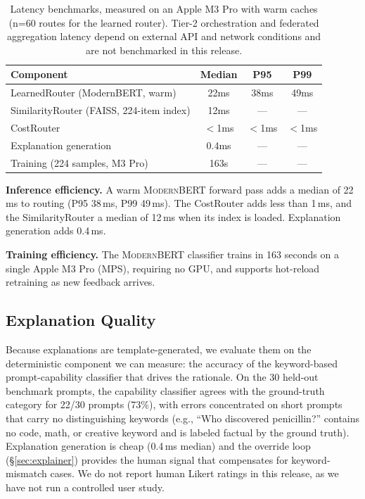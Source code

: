 \documentclass[11pt,a4paper]{article}
\newcommand{\modernbert}{\textsc{ModernBERT}}
\begin{document}
\begin{table}[t]
\centering
\small
\begin{tabular}{lccc}
\toprule
\textbf{Component} & \textbf{Median} & \textbf{P95} & \textbf{P99} \\
\midrule
LearnedRouter (ModernBERT, warm) & 22ms & 38ms & 49ms \\
SimilarityRouter (FAISS, 224-item index) & 12ms & --- & --- \\
CostRouter & $<$1ms & $<$1ms & $<$1ms \\
Explanation generation & 0.4ms & --- & --- \\
Training (224 samples, M3 Pro) & 163s & --- & --- \\
\bottomrule
\end{tabular}
\caption{Latency benchmarks, measured on an Apple M3 Pro with warm caches (n=60 routes for the learned router). Tier-2 orchestration and federated aggregation latency depend on external API and network conditions and are not benchmarked in this release.}
\label{tab:latency}
\end{table}

\textbf{Inference efficiency.}
A warm \modernbert{} forward pass adds a median of 22\,ms to routing (P95 38\,ms, P99 49\,ms).
The CostRouter adds less than 1\,ms, and the SimilarityRouter a median of 12\,ms when its index is loaded.
Explanation generation adds 0.4\,ms.

\textbf{Training efficiency.}
The \modernbert{} classifier trains in 163 seconds on a single Apple M3 Pro (MPS), requiring no GPU, and supports hot-reload retraining as new feedback arrives.

\subsection{Explanation Quality}

Because explanations are template-generated, we evaluate them on the deterministic component we can measure: the accuracy of the keyword-based prompt-capability classifier that drives the rationale.
On the 30 held-out benchmark prompts, the capability classifier agrees with the ground-truth category for 22/30 prompts (73\%), with errors concentrated on short prompts that carry no distinguishing keywords (e.g., ``Who discovered penicillin?'' contains no code, math, or creative keyword and is labeled factual by the ground truth).
Explanation generation is cheap (0.4\,ms median) and the override loop (\S\ref{sec:explainer}) provides the human signal that compensates for keyword-mismatch cases.
We do not report human Likert ratings in this release, as we have not run a controlled user study.
\end{document}
